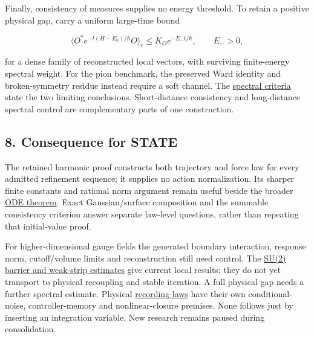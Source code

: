 \documentclass[11pt,a4paper]{article}
\begin{document}
Finally, consistency of measures supplies no energy threshold. To retain
a positive physical gap, carry a uniform large-time bound

\[\langle O^*e^{-t(H-E_0)/\hbar}O\rangle_c
\le K_Oe^{-E_-t/\hbar},\qquad E_->0,\]

for a dense family of reconstructed local vectors, with surviving
finite-energy spectral weight. For the pion benchmark, the preserved
Ward identity and broken-symmetry residue instead require a soft
channel. The \href{three-continuum-limits.md}{spectral criteria} state
the two limiting conclusions. Short-distance consistency and
long-distance spectral control are complementary parts of one
construction.

\hypertarget{consequence-for-state}{%
\subsection{8. Consequence for STATE}\label{consequence-for-state}}

The retained harmonic proof constructs both trajectory and force law for
every admitted refinement sequence; it supplies no action normalization.
Its sharper finite constants and rational norm argument remain useful
beside the broader \href{balaban-ode-lesson.md}{ODE theorem}. Exact
Gaussian/surface composition and the summable consistency criterion
answer separate law-level questions, rather than repeating that
initial-value proof.

For higher-dimensional gauge fields the generated boundary interaction,
response norm, cutoff/volume limits and reconstruction still need
control. The \href{su2-midplane-small-field.md}{SU(2) barrier and
weak-strip estimates} give current local results; they do not yet
transport to physical recoupling and stable iteration. A full physical
gap needs a further spectral estimate. Physical
\href{sed-closure-under-recording.md}{recording laws} have their own
conditional-noise, controller-memory and nonlinear-closure premises.
None follows just by inserting an integration variable. New research
remains paused during consolidation.
\end{document}
